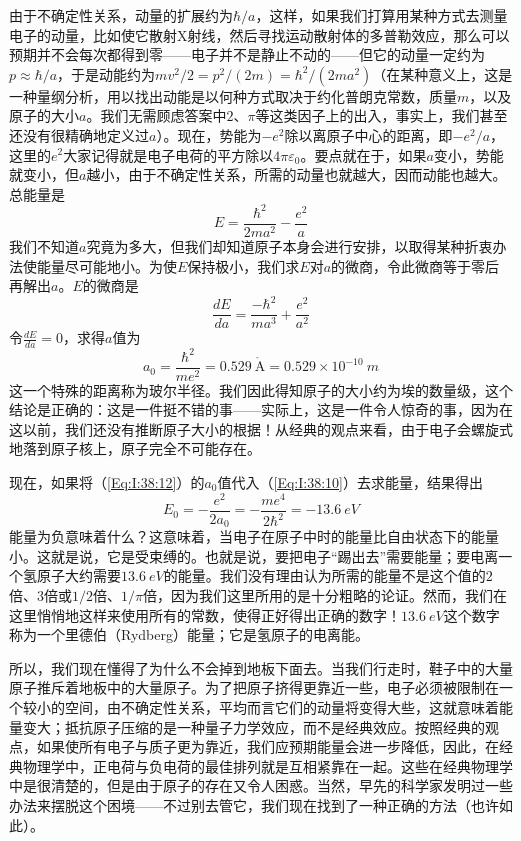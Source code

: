 由于不确定性关系，动量的扩展约为$\hbar/a$，这样，如果我们打算用某种方式去测量电子的动量，比如使它散射X射线，然后寻找运动散射体的多普勒效应，那么可以预期并不会每次都得到零——电子并不是静止不动的——但它的动量一定约为$p\approx\hbar/a$，于是动能约为$mv^2/2=p^2/(2m)=\hbar^2/(2ma^2)$（在某种意义上，这是一种量纲分析，用以找出动能是以何种方式取决于约化普朗克常数，质量$m$，以及原子的大小$a$。我们无需顾虑答案中$2$、$\pi$等这类因子上的出入，事实上，我们甚至还没有很精确地定义过$a$）。现在，势能为$-e^2$除以离原子中心的距离，即$-e^2/a$，这里的$e^2$大家记得就是电子电荷的平方除以$4\pi\varepsilon_0$。要点就在于，如果$a$变小，势能就变小，但$a$越小，由于不确定性关系，所需的动量也就越大，因而动能也越大。总能量是
\begin{equation}
    \label{Eq:I:38:10}
    E = \frac{\hbar^2}{2ma^2} - \frac{e^2}{a}
\end{equation}
我们不知道$a$究竟为多大，但我们却知道原子本身会进行安排，以取得某种折衷办法使能量尽可能地小。为使$E$保持极小，我们求$E$对$a$的微商，令此微商等于零后再解出$a$。$E$的微商是
\begin{equation}
    \label{Eq:I:38:11}
    \frac{dE}{da} = \frac{-\hbar^2}{ma^3} + \frac{e^2}{a^2}
\end{equation}
令$\frac{dE}{da} = 0$，求得$a$值为
\begin{equation}
    \label{Eq:I:38:12}
    a_0 = \frac{\hbar^2}{me^2} = 0.529~\mathring{\text{A}} = 0.529 \times 10^{-10}~m
\end{equation}
这一个特殊的距离称为玻尔半径。我们因此得知原子的大小约为埃的数量级，这个结论是正确的：这是一件挺不错的事——实际上，这是一件令人惊奇的事，因为在这以前，我们还没有推断原子大小的根据！从经典的观点来看，由于电子会螺旋式地落到原子核上，原子完全不可能存在。

现在，如果将（\ref{Eq:I:38:12}）的$a_0$值代入（\ref{Eq:I:38:10}）去求能量，结果得出
\begin{equation}
    \label{Eq:I:38:13}
    E_0 = -\frac{e^2}{2a_0} = -\frac{me^4}{2\hbar^2} = -13.6~eV
\end{equation}
能量为负意味着什么？这意味着，当电子在原子中时的能量比自由状态下的能量小。这就是说，它是受束缚的。也就是说，要把电子“踢出去”需要能量；要电离一个氢原子大约需要$13.6~eV$的能量。我们没有理由认为所需的能量不是这个值的$2$倍、$3$倍或$1/2$倍、$1/\pi$倍，因为我们这里所用的是十分粗略的论证。然而，我们在这里悄悄地这样来使用所有的常数，使得正好得出正确的数字！$13.6~eV$这个数字称为一个里德伯（Rydberg）能量；它是氢原子的电离能。

所以，我们现在懂得了为什么不会掉到地板下面去。当我们行走时，鞋子中的大量原子推斥着地板中的大量原子。为了把原子挤得更靠近一些，电子必须被限制在一个较小的空间，由不确定性关系，平均而言它们的动量将变得大些，这就意味着能量变大；抵抗原子压缩的是一种量子力学效应，而不是经典效应。按照经典的观点，如果使所有电子与质子更为靠近，我们应预期能量会进一步降低，因此，在经典物理学中，正电荷与负电荷的最佳排列就是互相紧靠在一起。这些在经典物理学中是很清楚的，但是由于原子的存在又令人困惑。当然，早先的科学家发明过一些办法来摆脱这个困境——不过别去管它，我们现在找到了一种正确的方法（也许如此）。

